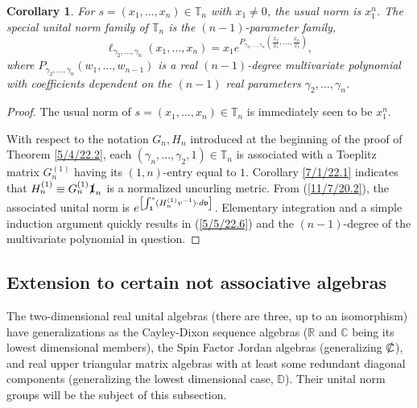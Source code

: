 \documentclass{amsart}
\numberwithin{equation}{section}
\newtheorem{corollary}[theorem]{Corollary}
\theoremstyle{definition}
\numberwithin{theorem}{section}
\begin{document}
\begin{corollary}\label{5/17/22.1} For $s= (x_1,\dots,x_n)\in \mathbb{T}_n$ with $x_1\ne 0$, the usual norm is $x_1^n$.  The special unital norm family of $\mathbb{T}_n$ is the $(n-1)$-parameter family,
\begin{equation} \label{5/5/22.6} \ell_{\gamma_2,\dots,\gamma_n}(x_1,\dots,x_n) = x_1 e^{P_{\gamma_2,\dots,\gamma_n}\left(\frac{x_2}{x_1},\dots,\frac{x_n}{x_1}\right)},\end{equation} where $P_{\gamma_2,\dots,\gamma_n}(w_1,\dots,w_{n-1})$ is a real $(n-1)$-degree multivariate polynomial with coefficients dependent on the $(n-1)$ real parameters $\gamma_2,\dots,\gamma_n$.    \end{corollary}

\begin{proof} The usual norm of $s=(x_1,\dots,x_n)\in \mathbb{T}_n$ is immediately seen to be $x_1^n$.

With respect to the notation $G_n,H_n$ introduced at the beginning of the proof of Theorem \ref{5/4/22.2}, each $(\gamma_n,\dots,\gamma_2,1)\in\mathbb{T}_n$ is associated with a Toeplitz matrix $G_n^{(1)}$ having its $(1,n)$-entry equal to $1$.  Corollary \ref{7/1/22.1} indicates that $H^{(1)}_n\equiv G_n^{(1)}\slashed{\bf 1}_n$ is a normalized uncurling metric. From (\ref{11/7/20.2}),  the associated unital norm is $e^{\left[\int_{\bf 1}^s (H_n^{(1)} v^{-1})\cdot d\mathfrak{v}\right]}$.  Elementary integration and a simple induction argument quickly results in (\ref{5/5/22.6}) and the $(n-1)$-degree of the multivariate polynomial in question.
\end{proof}
 
 \subsection{Extension to certain not associative algebras}
The two-dimensional real unital algebras (there are three, up to an isomorphism) have generalizations as the Cayley-Dixon sequence algebras ($\mathbb{R}$ and $\mathbb{C}$ being its lowest dimensional members),  the Spin Factor Jordan algebras (generalizing $\slashed{\mathbb{C}}$), and real upper triangular matrix algebras with at least some redundant diagonal components (generalizing the lowest dimensional case, $\mathbb{D}$).  Their unital norm groups will be the subject of this subsection. 
\end{document}

